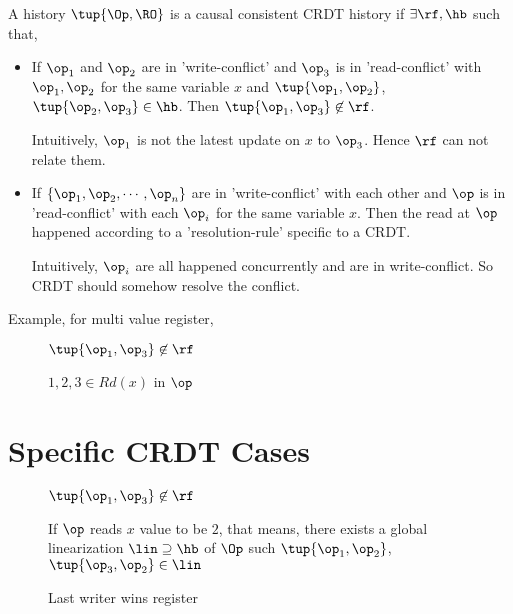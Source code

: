 A history $\tup{\Op, \RO}$ is a causal consistent CRDT history if $\exists \rf, \hb$ such that,

\begin{itemize}
 \item If $\op_1$ and $\op_2$ are in 'write-conflict' and $\op_3$ is in 'read-conflict' with $\op_1, \op_2$ for the same variable $x$ and $\tup{\op_1, \op_2}$, $\tup{\op_2, \op_3} \in \hb$. Then $\tup{\op_1, \op_3} \not\in \rf$.

       Intuitively, $\op_1$ is not the latest update on $x$ to $\op_3$. Hence $\rf$ can not relate them.

 \item If $\{\op_1, \op_2, \cdots, \op_n\}$ are in 'write-conflict' with each other and $\op$ is in 'read-conflict' with each $\op_i$ for the same variable $x$.
       Then the read at $\op$ happened according to a 'resolution-rule' specific to a CRDT.

       Intuitively, $\op_i$ are all happened concurrently and are in write-conflict. So CRDT should somehow resolve the conflict.
\end{itemize}

Example, for multi value register,
\begin{figure}[ht]
  \centering
  \begin{minipage}{.45\textwidth}
    
    \caption{$\tup{\op_1, \op_3} \not\in \rf$}
    \label{mvreg_eg:a}
  \end{minipage}
  \begin{minipage}{.45\textwidth}
    
    \caption{$1, 2, 3 \in Rd(x)$ in $\op$}
    \label{mvreg_eg:b}
  \end{minipage}
\end{figure}


\section{Specific CRDT Cases}

\begin{figure}[ht]
  \centering
  \begin{minipage}{.45\textwidth}
    
    \caption{$\tup{\op_1, \op_3} \not\in \rf$}
    \label{lwwreg:a}
  \end{minipage}
  \begin{minipage}{.45\textwidth}
    
    \caption{If $\op$ reads $x$ value to be $2$, that means, there exists a global linearization $\lin \supseteq \hb$ of $\Op$ such $\tup{\op_1, \op_2}$, $\tup{\op_3, \op_2} \in \lin$}
    \label{lwwreg:b}
  \end{minipage}
  \caption{Last writer wins register}
\end{figure}


